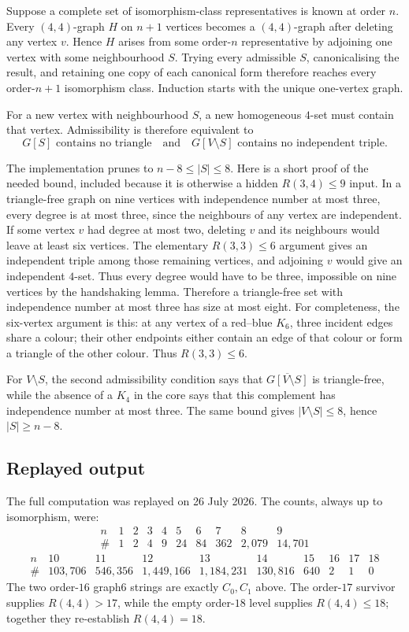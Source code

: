 \documentclass[11pt,a4paper]{article}
\theoremstyle{definition}
\theoremstyle{remark}
\begin{document}
Suppose a complete set of isomorphism-class representatives is known at
order \(n\).  Every \((4,4)\)-graph \(H\) on \(n+1\) vertices becomes a
\((4,4)\)-graph after deleting any vertex \(v\).  Hence \(H\) arises from
some order-\(n\) representative by adjoining one vertex with some
neighbourhood \(S\).  Trying every admissible \(S\), canonicalising the
result, and retaining one copy of each canonical form therefore reaches
every order-\(n+1\) isomorphism class.  Induction starts with the unique
one-vertex graph.

For a new vertex with neighbourhood \(S\), a new homogeneous \(4\)-set
must contain that vertex.  Admissibility is therefore equivalent to
\[
  G[S]\text{ contains no triangle}
  \quad\text{and}\quad
  G[V\setminus S]\text{ contains no independent triple}.
\]

The implementation prunes to \(n-8\leq|S|\leq8\).  Here is a short proof
of the needed bound, included because it is otherwise a hidden
\(R(3,4)\leq9\) input.  In a triangle-free graph on nine vertices with
independence number at most three, every degree is at most three, since
the neighbours of any vertex are independent.  If some vertex \(v\) had
degree at most two, deleting \(v\) and its neighbours would leave at
least six vertices.  The elementary \(R(3,3)\leq6\) argument gives an
independent triple among those remaining vertices, and adjoining \(v\)
would give an independent \(4\)-set.  Thus every degree would have to be
three, impossible on nine vertices by the handshaking lemma.  Therefore
a triangle-free set with independence number at most three has size at
most eight.  For completeness, the six-vertex argument is this: at any
vertex of a red--blue \(K_6\), three incident edges share a colour; their
other endpoints either contain an edge of that colour or form a triangle
of the other colour.  Thus \(R(3,3)\leq6\).

For \(V\setminus S\), the second admissibility condition says that
\(\overline{G[V\setminus S]}\) is triangle-free, while the absence of a
\(K_4\) in the core says that this complement has independence number at
most three.  The same bound gives \(|V\setminus S|\leq8\), hence
\(|S|\geq n-8\).

\subsection{Replayed output}

The full computation was replayed on 26 July 2026.  The counts, always
up to isomorphism, were:
\[
\begin{array}{c|rrrrrrrrr}
n&1&2&3&4&5&6&7&8&9\\ \hline
\#&1&2&4&9&24&84&362&2{,}079&14{,}701
\end{array}
\]
\[
\begin{array}{c|rrrrrrrrr}
n&10&11&12&13&14&15&16&17&18\\ \hline
\#&103{,}706&546{,}356&1{,}449{,}166&1{,}184{,}231&
130{,}816&640&2&1&0
\end{array}
\]
The two order-\(16\) graph6 strings are exactly \(C_0,C_1\) above.  The
order-\(17\) survivor supplies \(R(4,4)>17\), while the empty order-\(18\)
level supplies \(R(4,4)\leq18\); together they re-establish
\(R(4,4)=18\).
\end{document}
